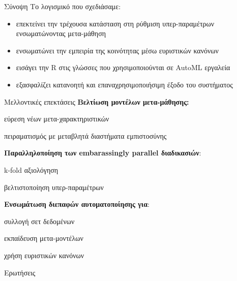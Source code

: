 \documentclass{beamer}
\begin{document}
  \begin{frame}{Σύνοψη} 
   Το λογισμικό που σχεδιάσαμε: 
  	\begin{itemize}
  		\item επεκτείνει την τρέχουσα κατάσταση στη ρύθμιση υπερ-παραμέτρων ενσωματώνοντας μετα-μάθηση
  		\item ενσωματώνει την εμπειρία της κοινότητας μέσω ευριστικών κανόνων
  		\item εισάγει την R στις γλώσσες που χρησιμοποιούνται σε AutoML εργαλεία
  		\item εξασφαλίζει κατανοητή και επαναχρησιμοποιήσιμη έξοδο του συστήματος 
  	\end{itemize}
  \end{frame}
  \begin{frame}{Μελλοντικές επεκτάσεις} 
  	\textbf{Βελτίωση μοντέλων μετα-μάθησης:}
  	\begin{itemize}
  		{\small
  			 \item εύρεση νέων μετα-χαρακτηριστικών
  			\item πειραματισμός με μεταβλητά διαστήματα εμπιστοσύνης}
  		
  		\end{itemize}  	
  		
  	\textbf{Παραλληλοποίηση των embarassingly parallel διαδικασιών}:
  	\begin{itemize}
  		{\small
  		\item k-fold αξιολόγηση
  		\item βελτιστοποίηση υπερ-παραμέτρων	}
  		 
  	\end{itemize}  	   	  	
  	\textbf{Ενσωμάτωση διεπαφών αυτοματοποίησης για}:
  	\begin{itemize}
  		{\small
  			\item συλλογή σετ δεδομένων
  			\item εκπαίδευση μετα-μοντέλων
  			\item χρήση ευριστικών κανόνων}  		
  	\end{itemize}
  \end{frame}  
  \begin{frame}[standout]{} 
    \begin{center}
    Ερωτήσεις
    \end{center}
  \end{frame}
  \begin{frame}[allowframebreaks]{}
\nocite{*}
\printbibliography[title=Bιβλιογραφία ]
  \end{frame} 
\end{document}
